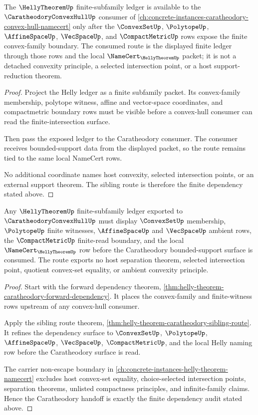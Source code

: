 \begin{theorem}
\label{thm:helly-theorem-caratheodory-sibling-route}
The $\HellyTheoremUp$ finite-subfamily ledger is available to the $\CaratheodoryConvexHullUp$ consumer of \autoref{ch:concrete-instances-caratheodory-convex-hull-namecert} only after the $\ConvexSetUp$, $\PolytopeUp$, $\AffineSpaceUp$, $\VecSpaceUp$, and $\CompactMetricUp$ rows expose the finite convex-family boundary. The consumed route is the displayed finite ledger through those rows and the local $\NameCert_{\HellyTheoremUp}$ packet; it is not a detached convexity principle, a selected intersection point, or a host support-reduction theorem.
\end{theorem}
\begin{proof}
Project the Helly ledger as a finite subfamily packet. Its convex-family membership, polytope witness, affine and vector-space coordinates, and compactmetric boundary rows must be visible before a convex-hull consumer can read the finite-intersection surface.

Then pass the exposed ledger to the Caratheodory consumer. The consumer receives bounded-support data from the displayed packet, so the route remains tied to the same local NameCert rows.

No additional coordinate names host convexity, selected intersection points, or an external support theorem. The sibling route is therefore the finite dependency stated above.
\end{proof}

\begin{theorem}
\label{thm:helly-theorem-caratheodory-finite-dependency-audit}
Any $\HellyTheoremUp$ finite-subfamily ledger exported to $\CaratheodoryConvexHullUp$ must display $\ConvexSetUp$ membership, $\PolytopeUp$ finite witnesses, $\AffineSpaceUp$ and $\VecSpaceUp$ ambient rows, the $\CompactMetricUp$ finite-read boundary, and the local $\NameCert_{\HellyTheoremUp}$ row before the Caratheodory bounded-support surface is consumed. The route exports no host separation theorem, selected intersection point, quotient convex-set equality, or ambient convexity principle.
\end{theorem}
\begin{proof}
Start with the forward dependency theorem, \autoref{thm:helly-theorem-caratheodory-forward-dependency}. It places the convex-family and finite-witness rows upstream of any convex-hull consumer.

Apply the sibling route theorem, \autoref{thm:helly-theorem-caratheodory-sibling-route}. It refines the dependency surface to $\ConvexSetUp$, $\PolytopeUp$, $\AffineSpaceUp$, $\VecSpaceUp$, $\CompactMetricUp$, and the local Helly naming row before the Caratheodory surface is read.

The carrier non-escape boundary in \autoref{ch:concrete-instances-helly-theorem-namecert} excludes host convex-set equality, choice-selected intersection points, separation theorems, unlisted compactness principles, and infinite-family claims. Hence the Caratheodory handoff is exactly the finite dependency audit stated above.
\end{proof}

